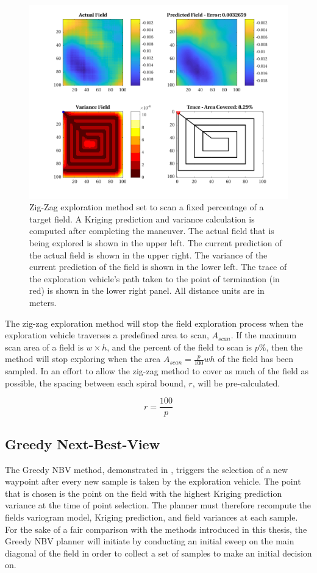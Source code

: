 \begin{figure}[hbt!]
    \centering
    \includegraphics[width=0.9\linewidth]{figures/hbresults/zz_10p_100x100_sf_25_seed_2.png}
    \captionsetup{skip=0.20\baselineskip}
    \ssp
    \caption{Zig-Zag exploration method set to scan a fixed percentage of a target field. A Kriging prediction and variance calculation is computed after completing the maneuver. The actual field that is being explored is shown in the upper left. The current prediction of the actual field is shown in the upper right. The variance of the current prediction of the field is shown in the lower left. The trace of the exploration vehicle's path taken to the point of termination (in red) is shown in the lower right panel. All distance units are in meters.}
    \label{fig:zigzag4}
\end{figure}
\clearpage

The zig-zag exploration method will stop the field exploration process when the exploration vehicle traverses a predefined area to scan, $A_{scan}$. If the maximum scan area of a field is $w \times h$, and the percent of the field to scan is $p\%$, then the method will stop exploring when the area $A_{scan} = \frac{p}{100}wh$ of the field has been sampled. In an effort to allow the zig-zag method to cover as much of the field as possible, the spacing between each spiral bound, $r$, will be pre-calculated.

\begin{equation}
    r = \frac{100}{p}
\end{equation}

\subsection{Greedy Next-Best-View}
The Greedy NBV method, demonstrated in \cite{fentanes:soilkrig}, triggers the selection of a new waypoint after every new sample is taken by the exploration vehicle. The point that is chosen is the point on the field with the highest Kriging prediction variance at the time of point selection. The planner must therefore recompute the fields variogram model, Kriging prediction, and field variances at each sample. For the sake of a fair comparison with the methods introduced in this thesis, the Greedy NBV planner will initiate by conducting an initial sweep on the main diagonal of the field in order to collect a set of samples to make an initial decision on.

